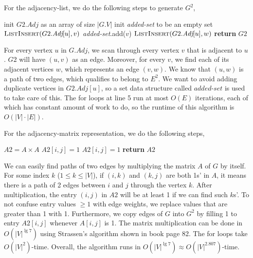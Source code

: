 \documentclass[11pt]{article}
\theoremstyle{definition}
\theoremstyle{theorem}
\begin{document}
For the adjacency-list, we do the following steps to generate $G^2$,
\begin{algorithmic}[1]
	\State init $G2.\textit{Adj}$ as an array of size $|G.V|$
		\State init \textit{added-set} to be an empty set 
		 
			\State $\textproc{\textsc{ListInsert}}(G2.\textit{Adj}[u], v)$
			\State \textit{added-set}.add($v$)
				
					\State $\textproc{\textsc{ListInsert}}(G2.\textit{Adj}[u], w)$
				\EndIf
			\EndFor
		\EndFor
	\EndFor
	\State \textbf{return} $G2$
\EndFunction
\end{algorithmic}

For every vertex $u$ in $G.\textit{Adj}$, we scan through every vertex $v$ that is adjacent to $u$. $G2$ will have $(u, v)$ as an edge. Moreover, for every $v$, we find each of its adjacent vertices $w$, which represents an edge $(v, w)$. We know that $(u, w)$ is a path of two edges, which qualifies to belong to $E^2$. We want to avoid adding duplicate vertices in $G2.\textit{Adj}[u]$, so a set data structure called $\textit{added-set}$ is used to take care of this. The for loops at line 5 run at most $O(E)$ iterations, each of which has constant amount of work to do, so the runtime of this algorithm is $O(|V| \cdot |E|)$.

For the adjacency-matrix representation, we do the following steps,
\begin{algorithmic}[1]
 
	\State $A2 = A \times A$ 
				\State $A2[i, j] = 1$
			\EndIf
				\State $A2[i, j] = 1$
			\EndIf
		\EndFor
	\EndFor
	\State \textbf{return} $A2$
\EndFunction
\end{algorithmic}

We can easily find paths of two edges by multiplying the matrix $A$ of $G$ by itself. For some index $k$ ($1 \le k \le |V|$), if $(i, k)$ and $(k, j)$ are both 1s' in $A$, it means there is a path of 2 edges between $i$ and $j$ through the vertex $k$. After multiplication, the entry $(i, j)$ in $A2$ will be at least 1 if we can find such $k$s'. To not confuse entry values $\ge 1$ with edge weights, we replace values that are greater than 1 with 1. Furthermore, we copy edges of $G$ into $G^2$ by filling 1 to entry $A2[i, j]$ whenever $A[i, j]$ is 1. The matrix multiplication can be done in $O(|V|^{\lg 7})$ using Strassen’s algorithm shown in book page 82. The for loops take $O(|V|^2)$-time. Overall, the algorithm runs in $O(|V|^{\lg 7}) \approx O(|V|^{2.807})$-time.
\end{document}
